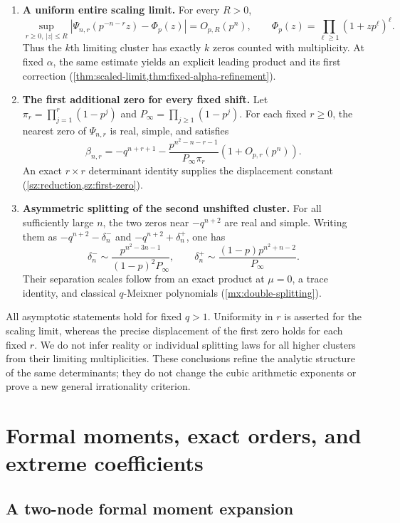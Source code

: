 \documentclass[11pt]{article}
\numberwithin{equation}{section}
\theoremstyle{definition}
\theoremstyle{remark}
\begin{document}
\begin{enumerate}
\item \textbf{A uniform entire scaling limit.}
For every $R>0$,
\[
 \sup_{r\ge0,\,|z|\le R}
 \left|\Psi_{n,r}(p^{-n-r}z)-\Phi_p(z)\right|=O_{p,R}(p^n),
 \qquad
 \Phi_p(z)=\prod_{\ell\ge1}(1+zp^\ell)^\ell.
\]
Thus the $k$th limiting cluster has exactly $k$ zeros counted with
multiplicity. At fixed $\alpha$, the same estimate yields an explicit
leading product and its first correction
(\cref{thm:scaled-limit,thm:fixed-alpha-refinement}).

\item \textbf{The first additional zero for every fixed shift.}
Let $\pi_r=\prod_{j=1}^r(1-p^j)$ and
$P_\infty=\prod_{j\ge1}(1-p^j)$. For each fixed $r\ge0$, the nearest
zero of $\Psi_{n,r}$ is real, simple, and satisfies
\[
 \beta_{n,r}
 =-q^{n+r+1}
 -\frac{p^{n^2-n-r-1}}{P_\infty\pi_r}
   \left(1+O_{p,r}(p^n)\right).
\]
An exact $r\times r$ determinant identity supplies the displacement
constant (\cref{sz:reduction,sz:first-zero}).

\item \textbf{Asymmetric splitting of the second unshifted cluster.}
For all sufficiently large $n$, the two zeros near $-q^{n+2}$ are
real and simple. Writing them as
$-q^{n+2}-\delta_n^-$ and $-q^{n+2}+\delta_n^+$, one has
\[
 \delta_n^-\sim
 \frac{p^{n^2-3n-1}}{(1-p)^2P_\infty},
 \qquad
 \delta_n^+\sim
 \frac{(1-p)p^{n^2+n-2}}{P_\infty}.
\]
Their separation scales follow from an exact product at $\mu=0$,
a trace identity, and classical $q$-Meixner polynomials
(\cref{mx:double-splitting}).
\end{enumerate}

All asymptotic statements hold for fixed $q>1$. Uniformity in $r$ is
asserted for the scaling limit, whereas the precise displacement of the
first zero holds for each fixed $r$. We do not infer reality or individual
splitting laws for all higher clusters from their limiting multiplicities.
These conclusions refine the analytic structure of the same determinants;
they do not change the cubic arithmetic exponents or prove a new general
irrationality criterion.

\section{Formal moments, exact orders, and extreme coefficients}\label{sec:formal}

\subsection{A two-node formal moment expansion}
\end{document}
